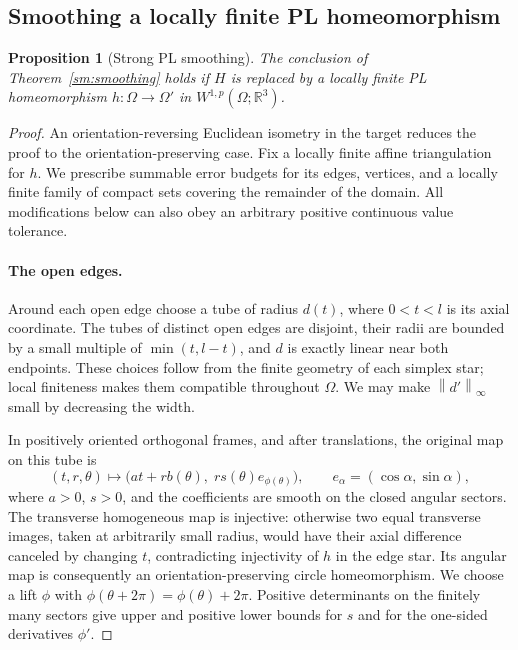 \documentclass[11pt]{article}
\numberwithin{equation}{section}
\newtheorem{proposition}[theorem]{Proposition}
\theoremstyle{definition}
\theoremstyle{remark}
\begin{document}
\subsection{Smoothing a locally finite PL homeomorphism}

\begin{proposition}[Strong PL smoothing]
\label{sm:pl-smoothing}
The conclusion of Theorem~\ref{sm:smoothing} holds if $H$ is replaced
by a locally finite PL homeomorphism
$h:\Omega\to\Omega'$ in $W^{1,p}(\Omega;\mathbb R^3)$.
\end{proposition}

\begin{proof}
An orientation-reversing Euclidean isometry in the target reduces
the proof to the orientation-preserving case.  Fix a locally finite
affine triangulation for $h$.  We prescribe summable error budgets
for its edges, vertices, and a locally finite family of compact sets
covering the remainder of the domain.  All modifications below can
also obey an arbitrary positive continuous value tolerance.

\paragraph{The open edges.}
Around each open edge choose a tube of radius $d(t)$, where
$0<t<l$ is its axial coordinate.  The tubes of distinct open edges
are disjoint, their radii are bounded by a small multiple of
$\min(t,l-t)$, and $d$ is exactly linear near both endpoints.
These choices follow from the finite geometry of each simplex star;
local finiteness makes them compatible throughout $\Omega$.
We may make $\left\lVert d'\right\rVert_\infty$ small by decreasing the width.

In positively oriented orthogonal frames, and after translations,
the original map on this tube is
\begin{equation}
 \label{sm:edge-form}
 (t,r,\theta)\longmapsto
 \bigl(at+r b(\theta),\;r s(\theta)e_{\phi(\theta)}\bigr),
 \qquad e_\alpha=(\cos\alpha,\sin\alpha),
\end{equation}
where $a>0$, $s>0$, and the coefficients are smooth on the closed
angular sectors.  The transverse homogeneous map is injective:
otherwise two equal transverse images, taken at arbitrarily small
radius, would have their axial difference canceled by changing $t$,
contradicting injectivity of $h$ in the edge star.  Its angular
map is consequently an orientation-preserving circle
homeomorphism.  We choose a lift $\phi$ with
$\phi(\theta+2\pi)=\phi(\theta)+2\pi$.
Positive determinants on the finitely many sectors give upper and
positive lower bounds for $s$ and for the one-sided derivatives
$\phi'$.


\end{proof}
\end{document}
